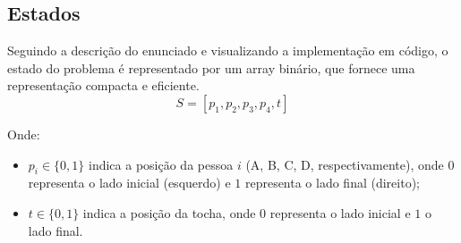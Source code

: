 \documentclass[12pt,a4paper]{article}
\begin{document}




\subsection{Estados}
Seguindo a descrição do enunciado e visualizando a implementação em código, o estado do problema é representado por um array binário, que fornece uma representação compacta e eficiente.
\[
S = [p_1, p_2, p_3, p_4, t]
\]

Onde:
\begin{itemize}
    \item $p_i \in \{0, 1\}$ indica a posição da pessoa $i$ (A, B, C, D, respectivamente), onde $0$ representa o lado inicial (esquerdo) e $1$ representa o lado final (direito);
    \item $t \in \{0, 1\}$ indica a posição da tocha, onde $0$ representa o lado inicial e $1$ o lado final.
\end{itemize}
\end{document}
